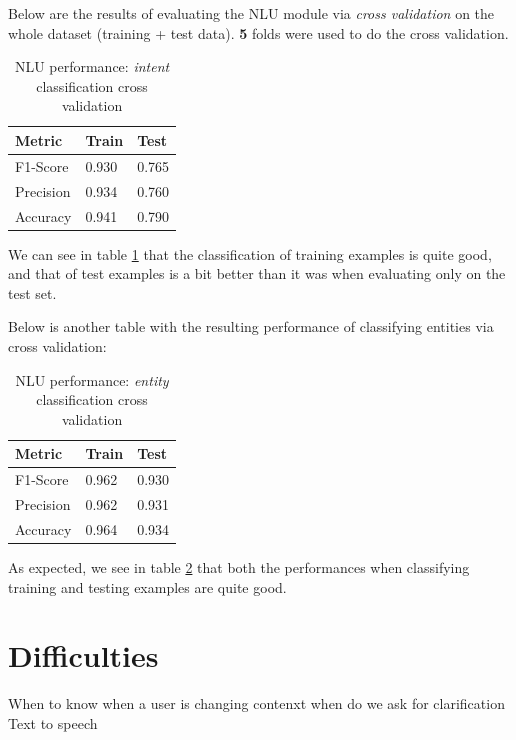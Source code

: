 \documentclass[11pt,a4paper]{article}
\begin{document}
	Below are the results of evaluating the NLU module via \textit{cross validation} on the whole dataset (training + test data). \textbf{5} folds were used to do the cross validation.
	
	\begin{table}[h!]
		\centering
		\begin{tabular}{l|l|l}
			\textbf{Metric} & \textbf{Train} & \textbf{Test} \\ 
			\hline 
			F1-Score & 0.930 & 0.765 \\ 
			\hline 
			Precision & 0.934 & 0.760\\ 
			\hline 
			Accuracy & 0.941 & 0.790 \\ 
			\hline 
		\end{tabular} 
		\caption{NLU performance: \textit{intent} classification cross validation}
		\label{table:2}
	\end{table}	
	
	We can see in table \ref{table:2} that the classification of training examples is quite good, and that of test examples is a bit better than it was when evaluating only on the test set. 
	
	Below is another table with the resulting performance of classifying entities via cross validation:
	
	\begin{table}[h!]
		\centering
		\begin{tabular}{l|l|l}
			\textbf{Metric} & \textbf{Train} & \textbf{Test} \\ 
			\hline 
			F1-Score & 0.962 & 0.930 \\ 
			\hline 
			Precision & 0.962 & 0.931 \\ 
			\hline 
			Accuracy & 0.964 & 0.934 \\ 
			\hline 
		\end{tabular} 
		\caption{NLU performance: \textit{entity} classification cross validation}
		\label{table:3}
	\end{table}	

	As expected, we see in table \ref{table:3} that both the performances when classifying training and testing examples are quite good. 
	

\section{Difficulties}
\label{sec-difficulties}

	When to know when a user is changing contenxt
	when do we ask for clarification
	Text to speech
\end{document}
